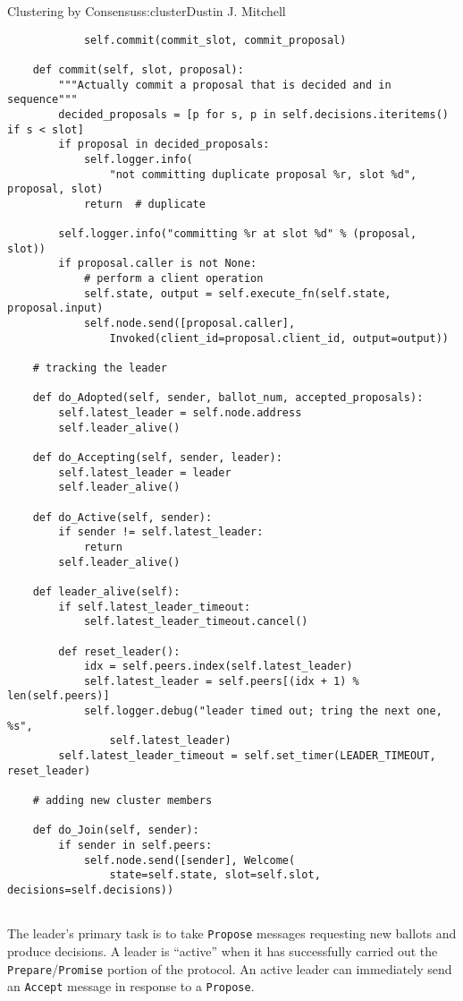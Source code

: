 \begin{aosachapter}{Clustering by Consensus}{s:cluster}{Dustin J. Mitchell}
\begin{verbatim}
            self.commit(commit_slot, commit_proposal)

    def commit(self, slot, proposal):
        """Actually commit a proposal that is decided and in sequence"""
        decided_proposals = [p for s, p in self.decisions.iteritems() if s < slot]
        if proposal in decided_proposals:
            self.logger.info(
                "not committing duplicate proposal %r, slot %d", proposal, slot)
            return  # duplicate

        self.logger.info("committing %r at slot %d" % (proposal, slot))
        if proposal.caller is not None:
            # perform a client operation
            self.state, output = self.execute_fn(self.state, proposal.input)
            self.node.send([proposal.caller], 
                Invoked(client_id=proposal.client_id, output=output))

    # tracking the leader

    def do_Adopted(self, sender, ballot_num, accepted_proposals):
        self.latest_leader = self.node.address
        self.leader_alive()

    def do_Accepting(self, sender, leader):
        self.latest_leader = leader
        self.leader_alive()

    def do_Active(self, sender):
        if sender != self.latest_leader:
            return
        self.leader_alive()

    def leader_alive(self):
        if self.latest_leader_timeout:
            self.latest_leader_timeout.cancel()

        def reset_leader():
            idx = self.peers.index(self.latest_leader)
            self.latest_leader = self.peers[(idx + 1) % len(self.peers)]
            self.logger.debug("leader timed out; tring the next one, %s", 
                self.latest_leader)
        self.latest_leader_timeout = self.set_timer(LEADER_TIMEOUT, reset_leader)

    # adding new cluster members

    def do_Join(self, sender):
        if sender in self.peers:
            self.node.send([sender], Welcome(
                state=self.state, slot=self.slot, decisions=self.decisions))
    
\end{verbatim}

\label{leader-scout-and-commander}

The leader's primary task is to take \texttt{Propose} messages
requesting new ballots and produce decisions. A leader is ``active''
when it has successfully carried out the
\texttt{Prepare}/\texttt{Promise} portion of the protocol. An active
leader can immediately send an \texttt{Accept} message in response to a
\texttt{Propose}.


\end{aosachapter}
